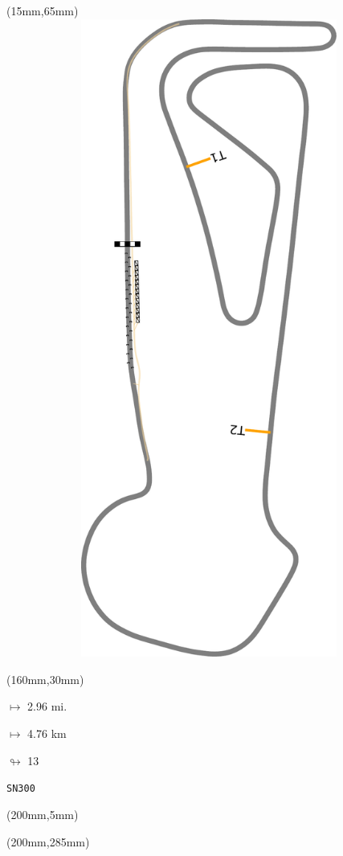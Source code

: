 \begin{textblock*}{185mm}(15mm,65mm)%
\centering
\mbox{\includegraphics[width=185mm,height=210mm,keepaspectratio]{PT/SN300.pdf}}
\end{textblock*}
\begin{textblock*}{40mm}(160mm,30mm)%
\Large
\par$\mapsto$ 2.96 mi.
\par$\mapsto$ 4.76 km
\par$\looparrowright$ 13
\par\hfill\tiny\tt SN300\\
\end{textblock*}
\begin{textblock*}{20mm}(200mm,5mm)%
\fbox{\thepage}
\label{SN300}
\end{textblock*}
\begin{textblock*}{20mm}(200mm,285mm)%
\fbox{\thepage}
\end{textblock*}

